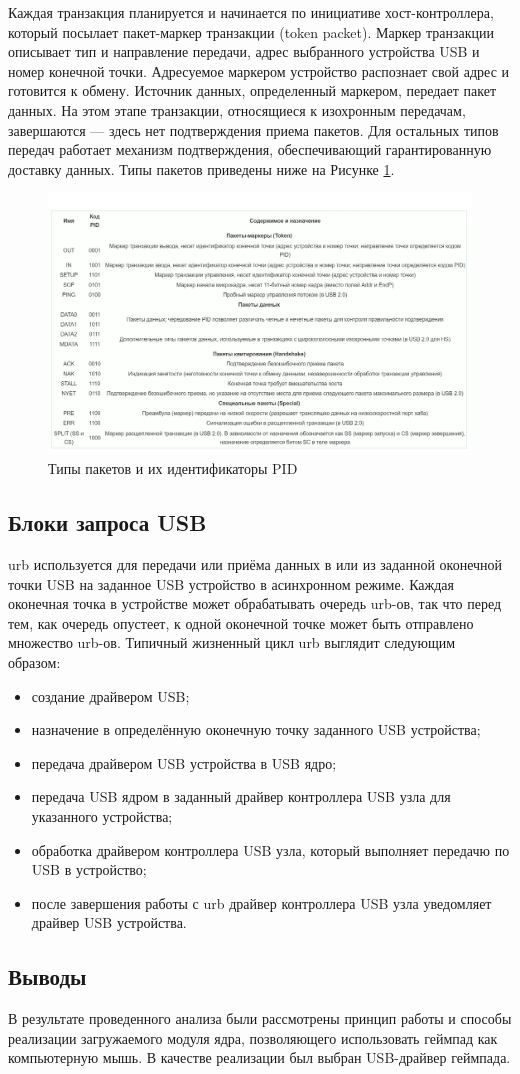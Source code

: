  Каждая транзакция планируется и начинается по инициативе хост-контроллера, который посылает пакет-маркер транзакции (token packet). Маркер транзакции описывает тип и направление передачи, адрес выбранного устройства USB и номер конечной точки. Адресуемое маркером устройство распознает свой адрес и готовится к обмену. Источник данных, определенный маркером, передает пакет данных. На этом этапе транзакции, относящиеся к изохронным передачам, завершаются — здесь нет подтверждения приема пакетов. Для остальных типов передач работает механизм подтверждения, обеспечивающий гарантированную доставку данных\cite{usb}. Типы пакетов приведены ниже на Рисунке \ref{packets-types}.
\begin{figure}[h!]
	\centering
	\includegraphics[scale=0.46]{img/packets-types.png}
	\caption{Типы пакетов и их идентификаторы PID}
	\label{packets-types}
\end{figure}\par

\subsection{Блоки запроса USB}
urb используется для передачи или приёма данных в или из заданной оконечной точки USB
на заданное USB устройство в асинхронном режиме. Каждая оконечная точка в
устройстве может обрабатывать очередь urb-ов, так что перед тем, как очередь опустеет, к
одной оконечной точке может быть отправлено множество urb-ов. Типичный жизненный цикл
urb выглядит следующим образом:
\begin{itemize}
	\item создание драйвером USB;
	\item назначение в определённую оконечную точку заданного USB устройства;
	\item передача драйвером USB устройства в USB ядро;
	\item передача USB ядром в заданный драйвер контроллера USB узла для указанного
	устройства;
	\item обработка драйвером контроллера USB узла, который выполняет передачю по USB в
	устройство;
	\item после завершения работы с urb драйвер контроллера USB узла уведомляет драйвер USB
	устройства.
\end{itemize}

\subsection{Выводы}
В результате проведенного анализа были рассмотрены принцип работы и способы реализации загружаемого модуля ядра,
позволяющего использовать геймпад как компьютерную мышь. В качестве реализации был выбран USB-драйвер геймпада.

\pagebreak

